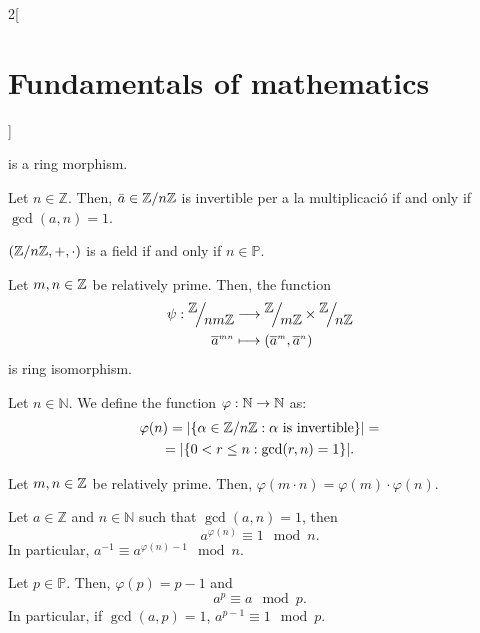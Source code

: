 \documentclass[../../../main.tex]{subfiles}
\begin{document}
\begin{multicols}{2}[\section{Fundamentals of mathematics}]
\begin{theorem}
        is a ring morphism.
    \end{theorem}
    \begin{lemma}
        Let $n\in\mathbb{Z}$. Then, $\bar{a}\in\quot{\ZZ}{n\ZZ}$ is invertible per a la multiplicació if and only if $\gcd(a,n)=1$.
    \end{lemma}
    \begin{corollary}
        $(\quot{\ZZ}{n\ZZ},+,\cdot)$ is a field if and only if $n\in\mathbb{P}$.
    \end{corollary}
    \begin{theorem}
        Let $m,n\in\mathbb{Z}$ be relatively prime. Then, the function
        \begin{align*}
            \psi:\quot{\ZZ}{nm\ZZ}&\longrightarrow\quot{\ZZ}{m\ZZ}\times\quot{\ZZ}{n\ZZ}\\
            \overline{a}^{\scriptscriptstyle mn}&\longmapsto(\overline{a}^{\scriptscriptstyle m},\overline{a}^{\scriptscriptstyle n})
        \end{align*}
        is ring isomorphism.
    \end{theorem}
    \begin{definition}
        Let $n\in\mathbb{N}$. We define the function $\varphi:\mathbb{N}\rightarrow\mathbb{N}$ as: 
        \begin{multline*}
            \varphi(n)=|\{\textstyle\alpha\in\quot{\ZZ}{n\ZZ}:\alpha \text{ is invertible}\}|=\\=|\{0<r\leq n: \gcd(r,n)=1\}|.
        \end{multline*}
    \end{definition}
    \begin{lemma}
        Let $m,n\in\mathbb{Z}$ be relatively prime. Then, $\varphi(m\cdot n)=\varphi(m)\cdot\varphi(n).$
    \end{lemma}
    \begin{theorem}
        Let $a\in\mathbb{Z}$ and $n\in\mathbb{N}$ such that $\gcd(a,n)=1$, then $$a^{\varphi(n)}\equiv 1\mod n.$$ In particular, $a^{-1}\equiv a^{\varphi(n)-1}\mod n$.
    \end{theorem}
    \begin{theorem}
        Let $p\in\mathbb{P}$. Then, $\varphi(p)=p-1$ and $$a^p\equiv a\mod p.$$ In particular, if $\gcd(a,p)=1$, $a^{p-1}\equiv 1\mod p$.
    \end{theorem}

\end{multicols}
\end{document}
